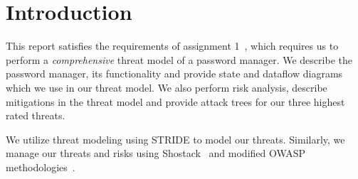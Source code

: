 \chapter{Introduction}
\label{ch:introduction}

This report satisfies the requirements of assignment
1~\cite{2017myersa1handout}, which requires us to perform a
\textit{comprehensive} threat model of a password manager.  We describe the
password manager, its functionality and provide state and dataflow diagrams
which we use in our threat model. We also perform risk analysis, describe
mitigations in the threat model and provide attack trees for our three highest
rated threats.  

\par We utilize threat modeling using STRIDE to model our threats.  Similarly,
we manage our threats and risks using Shostack~\cite{shostackbook} and modified
OWASP methodologies~\cite{owasprisk}.





